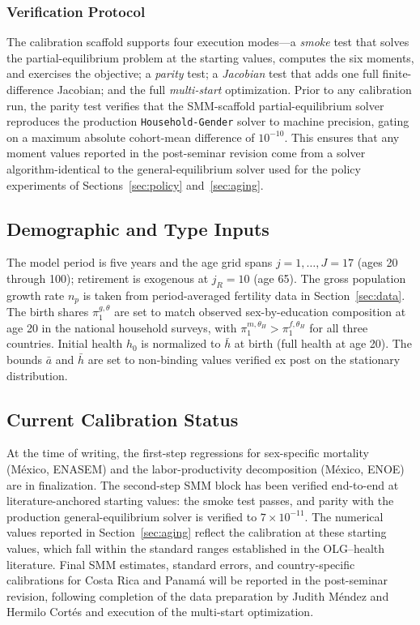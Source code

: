 \documentclass[12pt,a4paper]{article}
\begin{document}
\subsubsection{Verification Protocol}

The calibration scaffold supports four execution modes---a \textit{smoke} test that solves the partial-equilibrium problem at the starting values, computes the six moments, and exercises the objective; a \textit{parity} test; a \textit{Jacobian} test that adds one full finite-difference Jacobian; and the full \textit{multi-start} optimization. Prior to any calibration run, the parity test verifies that the SMM-scaffold partial-equilibrium solver reproduces the production \texttt{Household-Gender} solver to machine precision, gating on a maximum absolute cohort-mean difference of $10^{-10}$. This ensures that any moment values reported in the post-seminar revision come from a solver algorithm-identical to the general-equilibrium solver used for the policy experiments of Sections~\ref{sec:policy} and~\ref{sec:aging}.

\subsection{Demographic and Type Inputs}
\label{subsec:demographic_inputs}

The model period is five years and the age grid spans $j = 1, \ldots, J = 17$ (ages 20 through 100); retirement is exogenous at $j_R = 10$ (age 65). The gross population growth rate $n_p$ is taken from period-averaged fertility data in Section~\ref{sec:data}. The birth shares $\pi^{g,\theta}_1$ are set to match observed sex-by-education composition at age 20 in the national household surveys, with $\pi^{m,\theta_H}_1 > \pi^{f,\theta_H}_1$ for all three countries. Initial health $h_0$ is normalized to $\bar h$ at birth (full health at age 20). The bounds $\bar a$ and $\bar h$ are set to non-binding values verified ex post on the stationary distribution.

\subsection{Current Calibration Status}
\label{subsec:calib_status}

At the time of writing, the first-step regressions for sex-specific mortality (M\'exico, ENASEM) and the labor-productivity decomposition (M\'exico, ENOE) are in finalization. The second-step SMM block has been verified end-to-end at literature-anchored starting values: the smoke test passes, and parity with the production general-equilibrium solver is verified to $7\times10^{-11}$. The numerical values reported in Section~\ref{sec:aging} reflect the calibration at these starting values, which fall within the standard ranges established in the OLG--health literature. Final SMM estimates, standard errors, and country-specific calibrations for Costa Rica and Panam\'a will be reported in the post-seminar revision, following completion of the data preparation by Judith M\'endez and Hermilo Cort\'es and execution of the multi-start optimization.
\end{document}
